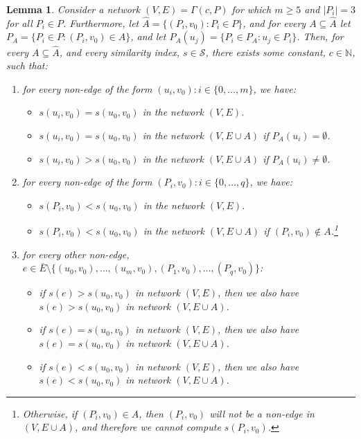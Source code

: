 \documentclass[twocolumn]{article}
\newtheorem{lemma}{Lemma}
\newcommand{\N}{\mathbb{N}}
\newcommand{\ER}{\bar{E}}
\newcommand{\FA}{\widehat{A}}
\newcommand{\PA}{P_{A}}
\begin{document}
\begin{lemma}
\label{lem:linkpred-fixed-relation}
Consider a network $(V,E)=\Gamma(c,P)$ for which $m \geq 5$ and $|P_i|=3$ for all $P_i\in P$. Furthermore, let $\FA=\{(P_i,v_0) : P_i \in P\}$, and for every $A \subseteq \FA$ let $\PA = \{P_i\in P:(P_i,v_0) \in A\}$, and let $\PA(u_j)=\{P_i \in \PA : u_j \in P_i\}$. Then, for every $A \subseteq \FA$, and every similarity index, $s \in \mathcal{S}$, there exists some constant, $c \in \N$, such that:

\begin{enumerate}[label=(\alph*)]
\item \label{pt:linkpred-req1} for every non-edge of the form $(u_i,v_0):i\in\{0,\ldots, m\}$, we have:
\begin{itemize}
\item $s(u_i,v_0)=s(u_0,v_0)$ in the network $(V,E)$.
\item $s(u_i,v_0)=s(u_0,v_0)$ in the network $(V,E\cup A)$ if $\PA(u_i) =  \emptyset$.
\item $s(u_i,v_0)>s(u_0,v_0)$ in the network $(V,E\cup A)$ if $\PA(u_i)\neq\emptyset$.
\end{itemize}

\item \label{pt:linkpred-req2} for every non-edge of the form $(P_i,v_0) : i\in\{0,\ldots,q\}$, we have:
\begin{itemize}
\item $s(P_i,v_0) < s(u_0,v_0)$ in the network $(V,E)$.
\item $s(P_i,v_0) < s(u_0,v_0)$ in the network $(V,E\cup A)$ if $(P_i,v_0) \notin A$.\footnote{\footnotesize{Otherwise, if $(P_i,v_0) \in A$, then $(P_i,v_0)$ will not be a non-edge in $(V,E\cup A)$, and therefore we cannot compute $s(P_i,v_0)$.}}
\end{itemize}

\item \label{pt:linkpred-req3} for every other non-edge, $e \in \ER \setminus \{(u_0,v_0),\ldots,(u_m,v_0),(P_1,v_0),\ldots,(P_q,v_0)\}$:
\begin{itemize}
        \item if $s(e)>s(u_0,v_0)$ in network $(V,E)$, then we also have $s(e)>s(u_0,v_0)$ in network $(V,E\cup A)$.
        \item if $s(e)=s(u_0,v_0)$ in network $(V,E)$, then we also have $s(e)=s(u_0,v_0)$ in network $(V,E\cup A)$.
        \item if $s(e)<s(u_0,v_0)$ in network $(V,E)$, then we also have $s(e)<s(u_0,v_0)$ in network $(V,E\cup A)$.
\end{itemize}
\end{enumerate}
\end{lemma}
\end{document}

